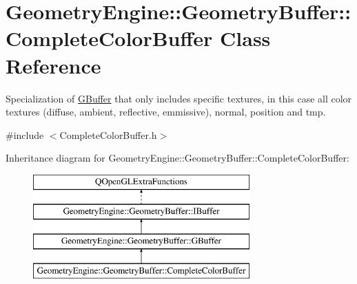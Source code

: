 \hypertarget{class_geometry_engine_1_1_geometry_buffer_1_1_complete_color_buffer}{}\section{Geometry\+Engine\+::Geometry\+Buffer\+::Complete\+Color\+Buffer Class Reference}
\label{class_geometry_engine_1_1_geometry_buffer_1_1_complete_color_buffer}


Specialization of \mbox{\hyperlink{class_geometry_engine_1_1_geometry_buffer_1_1_g_buffer}{G\+Buffer}} that only includes specific textures, in this case all color textures (diffuse, ambient, reflective, emmissive), normal, position and tmp.  




{\ttfamily \#include $<$Complete\+Color\+Buffer.\+h$>$}

Inheritance diagram for Geometry\+Engine\+::Geometry\+Buffer\+::Complete\+Color\+Buffer\+:\begin{figure}[H]
\begin{center}
\leavevmode
\includegraphics[height=4.000000cm]{class_geometry_engine_1_1_geometry_buffer_1_1_complete_color_buffer}
\end{center}
\end{figure}
